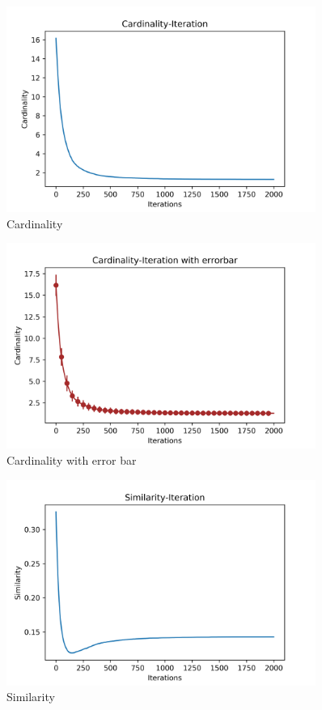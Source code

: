 \documentclass[a4paper,12pt]{article}
\begin{document}
\begin{figure}[H]
	\centering
	\includegraphics[width=0.9\textwidth]{Card50_5_2000_100_1}
	\caption{Cardinality}\label{Card50_5_2000_100_1s}
\end{figure}

\begin{figure}[H]
	\centering
	\includegraphics[width=0.9\textwidth]{CardErr50_5_2000_100_1}
	\caption{Cardinality with error bar}\label{CardErr50_5_2000_100_1s}
\end{figure}

\begin{figure}[H]
	\centering
	\includegraphics[width=0.9\textwidth]{Sim50_5_2000_100_1}
	\caption{Similarity}\label{Sim50_5_2000_100_1s}
\end{figure}
\end{document}
